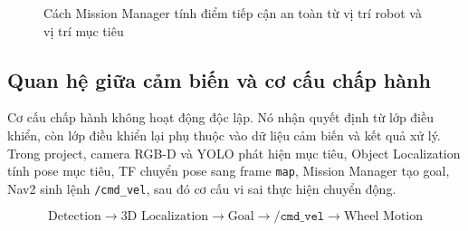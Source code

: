 \begin{figure}[H]
\centering
{}
\caption{Cách Mission Manager tính điểm tiếp cận an toàn từ vị trí robot và vị trí mục tiêu}
\label{fig:mission-manager-safe-goal}
\end{figure}

\subsection{Quan hệ giữa cảm biến và cơ cấu chấp hành}
\label{subsec:sensor-actuator-relation}

Cơ cấu chấp hành không hoạt động độc lập. Nó nhận quyết định từ lớp điều khiển, còn lớp điều khiển lại phụ thuộc vào dữ liệu cảm biến và kết quả xử lý. Trong project, camera RGB-D và YOLO phát hiện mục tiêu, Object Localization tính pose mục tiêu, TF chuyển pose sang frame \texttt{map}, Mission Manager tạo goal, Nav2 sinh lệnh \texttt{/cmd\_vel}, sau đó cơ cấu vi sai thực hiện chuyển động.

\begin{equation}
    \text{Detection}
    \rightarrow
    \text{3D Localization}
    \rightarrow
    \text{Goal}
    \rightarrow
    \texttt{/cmd\_vel}
    \rightarrow
    \text{Wheel Motion}
    \label{eq:detection-to-motion-flow}
\end{equation}

